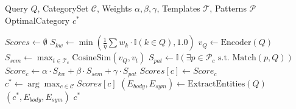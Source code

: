 \begin{algorithm}[h]
\caption{AcuRouter: Multi-Feature Fusion Semantic Routing}
\label{alg:acurouter}
\begin{algorithmic}[1]
\Require Query $Q$, CategorySet $\mathcal{C}$, Weights $\alpha, \beta, \gamma$, Templates $\mathcal{T}$, Patterns $\mathcal{P}$
\Ensure OptimalCategory $c^*$

    \State $Scores \leftarrow \emptyset$
        \State $S_{kw} \leftarrow \min(\frac{1}{\eta} \sum w_k \cdot \mathbb{I}(k \in Q), 1.0)$
        \State $v_Q \leftarrow \text{Encoder}(Q)$
        \State $S_{sem} \leftarrow \max_{t \in \mathcal{T}_c} \text{CosineSim}(v_Q, v_t)$
        \State $S_{pat} \leftarrow \mathbb{I}(\exists p \in \mathcal{P}_c \text{ s.t. } \text{Match}(p, Q))$
        \State $Score_c \leftarrow \alpha \cdot S_{kw} + \beta \cdot S_{sem} + \gamma \cdot S_{pat}$
        \State $Scores[c] \leftarrow Score_c$
    \EndFor
    \State $c^* \leftarrow \arg\max_{c \in \mathcal{C}} Scores[c]$
        \State $(E_{body}, E_{sym}) \leftarrow \text{ExtractEntities}(Q)$
        \State \Return $(c^*, E_{body}, E_{sym})$
    \EndIf
    \State \Return $c^*$
\EndFunction
\end{algorithmic}
\end{algorithm}
